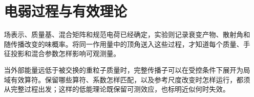 \chapter{电弱过程与有效理论}\label{chap:electroweak-processes}

场表示、质量基、混合矩阵和规范电荷已经确定，实验则记录衰变产物、散射角和随传播改变的味概率。将同一作用量中的顶角送入这些过程，才知道每个质量、手征投影和混合参数怎样影响可观测量。

当外部能量远低于被交换的重粒子质量时，完整传播子可以在受控条件下展开为局域有效算符。保留哪些算符、系数怎样匹配，以及参考尺度改变时怎样运行，都须从完整过程出发；这样的低能理论既保留可测效应，也标明近似何时失效。




